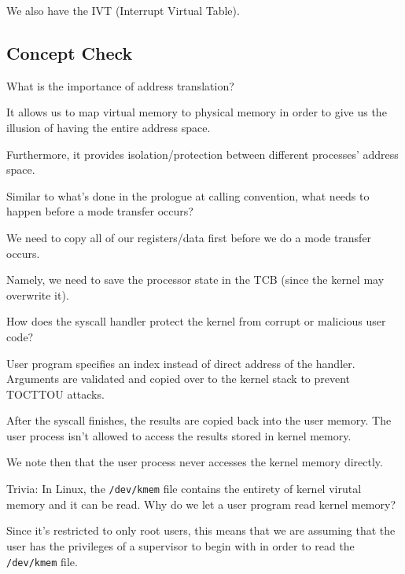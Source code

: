 \documentclass[openany]{book}
\begin{document}
We also have the IVT (Interrupt Virtual Table).

\subsection{Concept Check}
\begin{hw}
	What is the importance of address translation?
\end{hw}
\begin{solution}
	It allows us to map virtual memory to physical memory in order to give us the illusion of having the entire address space.
	
	Furthermore, it provides isolation/protection between different processes' address space.
\end{solution}

\begin{hw}
	Similar to what’s done in the prologue at calling convention, what needs to happen before a mode transfer occurs?
\end{hw}
\begin{solution}
	We need to copy all of our registers/data first before we do a mode transfer occurs.
	
	Namely, we need to save the processor state in the TCB (since the kernel may overwrite it).
\end{solution}

\begin{hw}
	How does the syscall handler protect the kernel from corrupt or malicious user code?
\end{hw}
\begin{solution}
	User program specifies an index instead of direct address of the handler. Arguments are validated and copied over to the kernel stack to prevent TOCTTOU attacks.
	
	After the syscall finishes, the results are copied back into the user memory. The user process isn't allowed to access the results stored in kernel memory.
	
	We note then that the user process never accesses the kernel memory directly.
\end{solution}

\begin{hw}
	Trivia: In Linux, the \texttt{/dev/kmem} file contains the entirety of kernel virutal memory and it can be read. Why do we let a user program read kernel memory?
\end{hw}
\begin{solution}
	Since it's restricted to only root users, this means that we are assuming that the user has the privileges of a supervisor to begin with in order to read the \texttt{/dev/kmem} file.
\end{solution}
\end{document}
